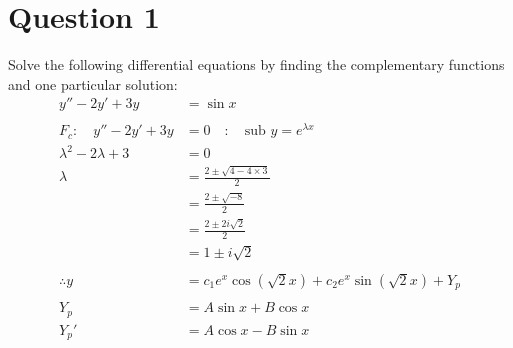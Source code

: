 \documentclass{article}
\begin{document}
\newcommand{\documentcourse}{MATH1851}
\newcommand{\documentnumber}{5}





\section*{Question 1}
Solve the following differential equations by finding the complementary functions and one particular solution:
\begin{align*}
    y''-2y'+3y                        & =\sin x                                                                          \\
    \\
    F_c:\quad y''-2y'+3y              & =0\quad:\quad\text{sub }y=e^{\lambda x}                                          \\
    \lambda^2-2\lambda+3              & =0                                                                               \\
    \lambda                           & =\frac{2\pm\sqrt{4-4\times3}}{2}                                                 \\
                                      & =\frac{2\pm\sqrt{-8}}{2}                                                         \\
                                      & =\frac{2\pm2i\sqrt{2}}{2}                                                        \\
                                      & =1\pm i\sqrt{2}                                                                  \\
    \\
    \therefore y                      & =c_1e^x\cos(\sqrt{2}x)+c_2e^x\sin(\sqrt{2}x)+Y_p                                 \\
    \\
    Y_p                               & = A\sin x+B\cos x                                                                \\
    Y_p'                              & = A\cos x-B\sin x                                                                \\

\end{align*}
\end{document}
